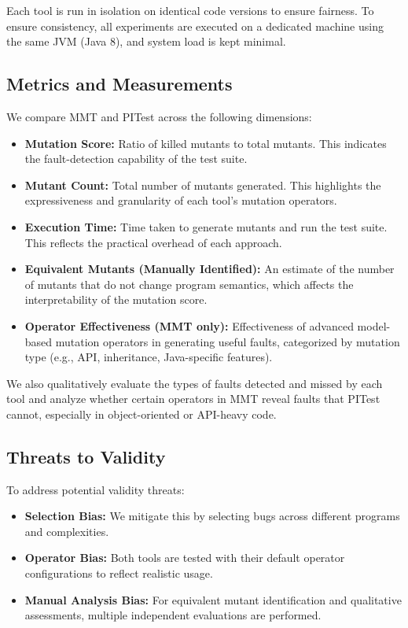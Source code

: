 \documentclass[12pt,a4paper]{article}
\begin{document}
Each tool is run in isolation on identical code versions to ensure fairness. To ensure consistency, all experiments are executed on a dedicated machine using the same JVM (Java 8), and system load is kept minimal.

\subsection{Metrics and Measurements}

We compare MMT and PITest across the following dimensions:

\begin{itemize}
\item \textbf{Mutation Score:} Ratio of killed mutants to total mutants. This indicates the fault-detection capability of the test suite.
\item \textbf{Mutant Count:} Total number of mutants generated. This highlights the expressiveness and granularity of each tool’s mutation operators.
\item \textbf{Execution Time:} Time taken to generate mutants and run the test suite. This reflects the practical overhead of each approach.
\item \textbf{Equivalent Mutants (Manually Identified):} An estimate of the number of mutants that do not change program semantics, which affects the interpretability of the mutation score.
\item \textbf{Operator Effectiveness (MMT only):} Effectiveness of advanced model-based mutation operators in generating useful faults, categorized by mutation type (e.g., API, inheritance, Java-specific features).
\end{itemize}

We also qualitatively evaluate the types of faults detected and missed by each tool and analyze whether certain operators in MMT reveal faults that PITest cannot, especially in object-oriented or API-heavy code.

\subsection{Threats to Validity}

To address potential validity threats:

\begin{itemize}
\item \textbf{Selection Bias:} We mitigate this by selecting bugs across different programs and complexities.
\item \textbf{Operator Bias:} Both tools are tested with their default operator configurations to reflect realistic usage.
\item \textbf{Manual Analysis Bias:} For equivalent mutant identification and qualitative assessments, multiple independent evaluations are performed.
\end{itemize}
\end{document}
